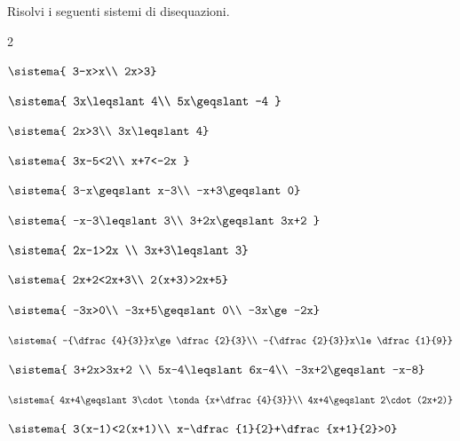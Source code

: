 \begin{esercizio}[*]
\label{ese:21.37}
Risolvi i seguenti sistemi di disequazioni.
\begin{htmulticols}{2}
\begin{enumeratea}
\item \(\sistema{
3-x>x\\
2x>3}\)
\sol{\emptyset}
\item \(\sistema{
3x\leqslant 4\\
5x\geqslant -4
}\)
\item \(\sistema{
2x>3\\
3x\leqslant 4}\)
\sol{\emptyset}
\item \(\sistema{
3x-5<2\\
x+7<-2x
}\)
\item \(\sistema{
3-x\geqslant x-3\\
-x+3\geqslant 0}\)
\item \(\sistema{
-x-3\leqslant 3\\
3+2x\geqslant 3x+2
}\)
\item \(\sistema{
2x-1>2x \\
3x+3\leqslant 3}\)
\sol{\emptyset}
\item \(\sistema{
2x+2<2x+3\\
2(x+3)>2x+5}\)
\sol{\R}
\item \(\sistema{
-3x>0\\
-3x+5\geqslant 0\\
-3x\ge-2x}\)
\item \(\sistema{
-{\dfrac{4}{3}}x\ge\dfrac{2}{3}\\
-{\dfrac{2}{3}}x\le\dfrac{1}{9}}\)
\sol{\emptyset}
\item \(\sistema{
3+2x>3x+2 \\
5x-4\leqslant 6x-4\\
-3x+2\geqslant -x-8}\)
\item \(\sistema{
4x+4\geqslant 3\cdot\tonda{x+\dfrac{4}{3}}\\
4x+4\geqslant 2\cdot (2x+2)}\)
\item \(\sistema{
3(x-1)<2(x+1)\\
x-\dfrac{1}{2}+\dfrac{x+1}{2}>0}\)
\end{enumeratea}
\end{htmulticols}
\end{esercizio}

